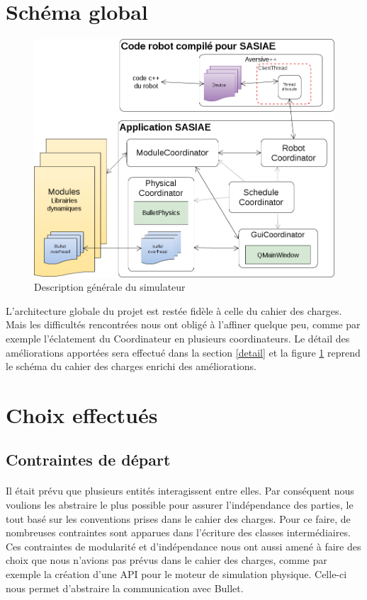 \section{Schéma global}

\begin{figure}[!h]
\includegraphics[width=\textwidth]{general}
\caption{Description générale du simulateur}
\label{descgenerale}
\end{figure}
\vspace{0 mm}
L'architecture globale du projet est restée fidèle à celle du cahier des charges. Mais les difficultés rencontrées nous ont obligé à l'affiner quelque peu, comme par exemple l'éclatement du Coordinateur en plusieurs coordinateurs. Le détail des améliorations apportées sera effectué dans la section \ref{detail} et la figure \ref{descgenerale} reprend le schéma du cahier des charges enrichi des améliorations.

\section{Choix effectués}

\subsection{Contraintes de départ}

\paragraph{}
Il était prévu que plusieurs entités interagissent entre elles. Par conséquent nous voulions les abstraire le plus possible pour assurer l'indépendance des parties, le tout basé sur les conventions prises dans le cahier des charges. Pour ce faire, de nombreuses contraintes sont apparues dans l'écriture des classes intermédiaires. Ces contraintes de modularité et d'indépendance nous ont aussi amené à faire des choix que nous n'avions pas prévus dans le cahier des charges, comme par exemple la création d'une API pour le moteur de simulation physique. Celle-ci nous permet d'abstraire la communication avec Bullet.

